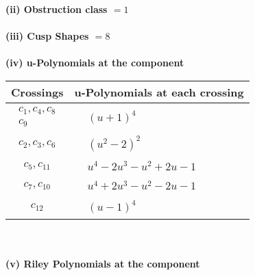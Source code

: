 \documentclass[1p]{elsarticle_modified}
\theoremstyle{definition}
\begin{document}
\flushleft \textbf{(ii) Obstruction class $= 1$}\\~\\
\flushleft \textbf{(iii) Cusp Shapes $= 8$}\\~\\
\newpage\renewcommand{\arraystretch}{1}
\flushleft \textbf{(iv) u-Polynomials at the component}\newline \\
\begin{tabular}{m{50pt}|m{274pt}}
Crossings & \hspace{64pt}u-Polynomials at each crossing \\
\hline $$\begin{aligned}c_{1},c_{4},c_{8}\\c_{9}\end{aligned}$$&$\begin{aligned}
&(u+1)^4
\end{aligned}$\\
\hline $$\begin{aligned}c_{2},c_{3},c_{6}\end{aligned}$$&$\begin{aligned}
&(u^2-2)^2
\end{aligned}$\\
\hline $$\begin{aligned}c_{5},c_{11}\end{aligned}$$&$\begin{aligned}
&u^4-2 u^3- u^2+2 u-1
\end{aligned}$\\
\hline $$\begin{aligned}c_{7},c_{10}\end{aligned}$$&$\begin{aligned}
&u^4+2 u^3- u^2-2 u-1
\end{aligned}$\\
\hline $$\begin{aligned}c_{12}\end{aligned}$$&$\begin{aligned}
&(u-1)^4
\end{aligned}$\\
\hline
\end{tabular}\\~\\
\newpage\renewcommand{\arraystretch}{1}
\flushleft \textbf{(v) Riley Polynomials at the component}\newline \\
\end{document}

